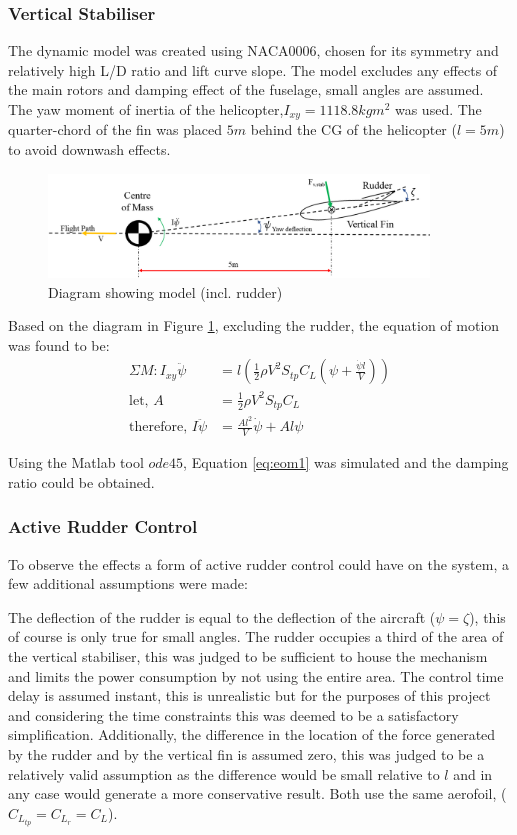 \documentclass[11pt,a4paper]{article}
\begin{document}
\subsubsection{Vertical Stabiliser}
The dynamic model was created using NACA0006, chosen for its symmetry and relatively high L/D ratio and lift curve slope. The model excludes any effects of the main rotors and damping effect of the fuselage, small angles are assumed. The yaw moment of inertia of the helicopter,$I_{xy}=1118.8 kgm^2$ was used. The quarter-chord of the fin was placed $5m$ behind the CG of the helicopter ($l=5m$) to avoid downwash effects. 
\begin{figure}[H]
	\centering
	\includegraphics[width=0.9\textwidth]{VertStabdiag.PNG}
	\caption{Diagram showing model (incl. rudder)}
	\centering
	\label{fig:vertdiag}
\end{figure}

Based on the diagram in Figure \ref{fig:vertdiag}, excluding the rudder, the equation of motion was found to be:
\begin{align}
\Sigma M: I_{xy}\ddot{\psi}&=l(\frac{1}{2}\rho V^2 S_{tp}C_L(\psi+\frac{\dot{\psi}l}{V})) \\
\text{let,}\,\, A&=\frac{1}{2}\rho V^2 S_{tp}C_L\\
 \text{therefore,}\,\,I\ddot{\psi}&=\frac{Al^2}{V}\dot{\psi}+A l\psi \label{eq:eom1}
\end{align}{}

Using the Matlab tool $ode45$, Equation \ref{eq:eom1} was simulated and the damping ratio could be obtained. \\

\subsubsection{Active Rudder Control}

To observe the effects a form of active rudder control could have on the system, a few additional assumptions were made:

The deflection of the rudder is equal to the deflection of the aircraft ($\psi=\zeta$), this of course is only true for small angles. The rudder occupies a third of the area of the vertical stabiliser, this was judged to be sufficient to house the mechanism and limits the power consumption by not using the entire area. The control time delay is assumed instant, this is unrealistic but for the purposes of this project and considering the time constraints this was deemed to be a satisfactory simplification. Additionally, the difference in the location of the force generated by the rudder and by the vertical fin is assumed zero, this was judged to be a relatively valid assumption as the difference would be small relative to $l$ and in any case would generate a more conservative result. Both use the same aerofoil, ($C_{L_{tp}}=C_{L_{r}}=C_L$).
\end{document}
